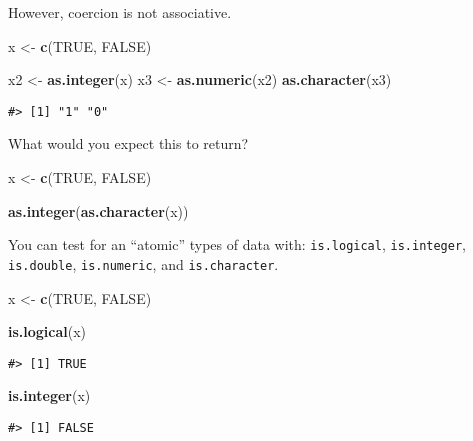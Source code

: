 \documentclass[]{book}
\newenvironment{Shaded}{\begin{snugshade}}{\end{snugshade}}
\newcommand{\KeywordTok}[1]{\textcolor[rgb]{0.13,0.29,0.53}{\textbf{#1}}}
\newcommand{\StringTok}[1]{\textcolor[rgb]{0.31,0.60,0.02}{#1}}
\newcommand{\OtherTok}[1]{\textcolor[rgb]{0.56,0.35,0.01}{#1}}
\newcommand{\NormalTok}[1]{#1}
\theoremstyle{definition}
\theoremstyle{definition}
\theoremstyle{definition}
\theoremstyle{remark}
\begin{document}
However, coercion is not associative.

\begin{Shaded}
\begin{Highlighting}[]
\NormalTok{x <-}\StringTok{ }\KeywordTok{c}\NormalTok{(}\OtherTok{TRUE}\NormalTok{, }\OtherTok{FALSE}\NormalTok{)}

\NormalTok{x2 <-}\StringTok{ }\KeywordTok{as.integer}\NormalTok{(x)}
\NormalTok{x3 <-}\StringTok{ }\KeywordTok{as.numeric}\NormalTok{(x2)}
\KeywordTok{as.character}\NormalTok{(x3)}
\end{Highlighting}
\end{Shaded}

\begin{verbatim}
#> [1] "1" "0"
\end{verbatim}

What would you expect this to return?

\begin{Shaded}
\begin{Highlighting}[]
\NormalTok{x <-}\StringTok{ }\KeywordTok{c}\NormalTok{(}\OtherTok{TRUE}\NormalTok{, }\OtherTok{FALSE}\NormalTok{)}

\KeywordTok{as.integer}\NormalTok{(}\KeywordTok{as.character}\NormalTok{(x))}
\end{Highlighting}
\end{Shaded}

You can test for an ``atomic'' types of data with: \texttt{is.logical},
\texttt{is.integer}, \texttt{is.double}, \texttt{is.numeric}, and
\texttt{is.character}.

\begin{Shaded}
\begin{Highlighting}[]
\NormalTok{x <-}\StringTok{ }\KeywordTok{c}\NormalTok{(}\OtherTok{TRUE}\NormalTok{, }\OtherTok{FALSE}\NormalTok{)}

\KeywordTok{is.logical}\NormalTok{(x)}
\end{Highlighting}
\end{Shaded}

\begin{verbatim}
#> [1] TRUE
\end{verbatim}

\begin{Shaded}
\begin{Highlighting}[]
\KeywordTok{is.integer}\NormalTok{(x)}
\end{Highlighting}
\end{Shaded}

\begin{verbatim}
#> [1] FALSE
\end{verbatim}
\end{document}
